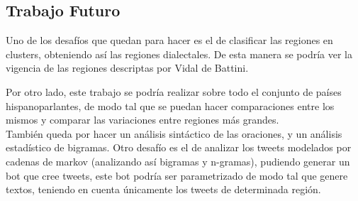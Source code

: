 
\subsection{Trabajo Futuro}

Uno de los desafíos que quedan para hacer es el de clasificar las regiones en clusters, obteniendo así las regiones dialectales. De esta manera se podría ver la vigencia de las regiones descriptas por Vidal de Battini. %


Por otro lado, este trabajo se podría realizar sobre todo el conjunto de países hispanoparlantes, de modo tal que se puedan hacer comparaciones entre los mismos y comparar las variaciones entre regiones más grandes.\\
También queda por hacer un análisis sintáctico de las oraciones, y un análisis estadístico de bigramas.
Otro desafío es el de analizar los tweets modelados por cadenas de markov (analizando así bigramas y n-gramas), pudiendo generar un bot que cree tweets, este bot podría ser parametrizado de modo tal que genere textos, teniendo en cuenta únicamente los tweets de determinada región.

